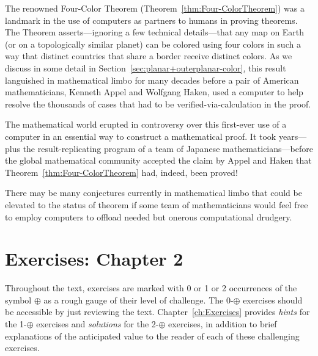   
The renowned Four-Color Theorem (Theorem~\ref{thm:Four-ColorTheorem}) was a landmark in the use of computers as partners to humans in proving theorems.  The Theorem asserts---ignoring a few technical details---that any map on Earth (or on a topologically similar planet) can be colored using four colors in such a way that distinct countries that share a border receive distinct colors.  As we discuss in some detail in Section~\ref{sec:planar+outerplanar-color}, this result languished in mathematical limbo for many decades before a pair of American mathematicians, Kenneth Appel and Wolfgang Haken, used a computer to help resolve the thousands of cases that had to be verified-via-calculation in the proof.

The mathematical world erupted in controversy over this first-ever use of a computer in an essential way to construct a mathematical proof.  It took years---plus the result-replicating program of a team of Japanese mathematicians---before the global mathematical community accepted the claim by Appel and Haken that Theorem~\ref{thm:Four-ColorTheorem} had, indeed, been proved!

\medskip

There may be many conjectures currently in mathematical limbo that could be elevated to the status of theorem if some team of mathematicians would feel free to employ computers to offload needed but onerous computational drudgery.



\section{Exercises: Chapter 2}

Throughout the text, exercises are marked with 0 or 1 or 2 occurrences of the symbol $\oplus$ as a rough gauge of their level of challenge.  The 0-$\oplus$ exercises should be accessible by just reviewing the text.  Chapter~\ref{ch:Exercises} provides {\em hints} for the 1-$\oplus$ exercises and {\em solutions} for the 2-$\oplus$ exercises, in addition to brief explanations of the anticipated value to the reader of each of these challenging exercises. 

